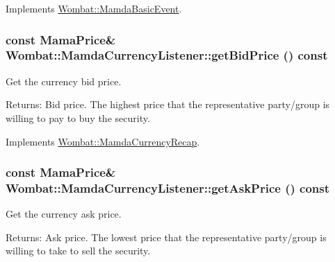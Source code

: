 Implements \hyperlink{classWombat_1_1MamdaBasicEvent_3454d51e1131d9949691ee4b4153cd97}{Wombat::Mamda\-Basic\-Event}.\hypertarget{classWombat_1_1MamdaCurrencyListener_3563aac40f16c6dd61f64e9d9c2e1b2e}{
\subsubsection[getBidPrice]{\setlength{\rightskip}{0pt plus 5cm}const Mama\-Price\& Wombat::Mamda\-Currency\-Listener::get\-Bid\-Price () const}}
\label{classWombat_1_1MamdaCurrencyListener_3563aac40f16c6dd61f64e9d9c2e1b2e}


Get the currency bid price. 

\begin{Desc}
\item[Returns:]Bid price. The highest price that the representative party/group is willing to pay to buy the security. \end{Desc}


Implements \hyperlink{classWombat_1_1MamdaCurrencyRecap_bce12f317bf48ecab3175f6d1581f853}{Wombat::Mamda\-Currency\-Recap}.\hypertarget{classWombat_1_1MamdaCurrencyListener_7e0b54e9607f5e4770ab22d2da0c63fe}{
\subsubsection[getAskPrice]{\setlength{\rightskip}{0pt plus 5cm}const Mama\-Price\& Wombat::Mamda\-Currency\-Listener::get\-Ask\-Price () const}}
\label{classWombat_1_1MamdaCurrencyListener_7e0b54e9607f5e4770ab22d2da0c63fe}


Get the currency ask price. 

\begin{Desc}
\item[Returns:]Ask price. The lowest price that the representative party/group is willing to take to sell the security. \end{Desc}


